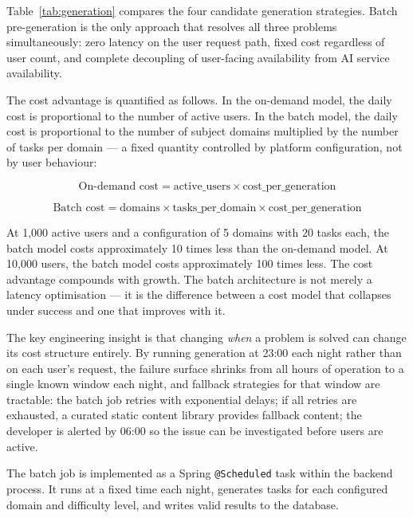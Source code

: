 Table~\ref{tab:generation} compares the four candidate generation strategies. Batch pre-generation is the only approach that resolves all three problems simultaneously: zero latency on the user request path, fixed cost regardless of user count, and complete decoupling of user-facing availability from AI service availability.

The cost advantage is quantified as follows. In the on-demand model, the daily cost is proportional to the number of active users. In the batch model, the daily cost is proportional to the number of subject domains multiplied by the number of tasks per domain --- a fixed quantity controlled by platform configuration, not by user behaviour:

\begin{equation}
\label{eq:cost}
    \text{On-demand cost} = \text{active\_users} \times \text{cost\_per\_generation}
\end{equation}

\begin{equation}
    \text{Batch cost} = \text{domains} \times \text{tasks\_per\_domain} \times \text{cost\_per\_generation}
\end{equation}

At 1,000 active users and a configuration of 5 domains with 20 tasks each, the batch model costs approximately 10 times less than the on-demand model. At 10,000 users, the batch model costs approximately 100 times less. The cost advantage compounds with growth. The batch architecture is not merely a latency optimisation --- it is the difference between a cost model that collapses under success and one that improves with it.

The key engineering insight is that changing \textit{when} a problem is solved can change its cost structure entirely. By running generation at 23:00 each night rather than on each user's request, the failure surface shrinks from all hours of operation to a single known window each night, and fallback strategies for that window are tractable: the batch job retries with exponential delays; if all retries are exhausted, a curated static content library provides fallback content; the developer is alerted by 06:00 so the issue can be investigated before users are active.

The batch job is implemented as a Spring \texttt{@Scheduled} task within the backend process. It runs at a fixed time each night, generates tasks for each configured domain and difficulty level, and writes valid results to the database.

